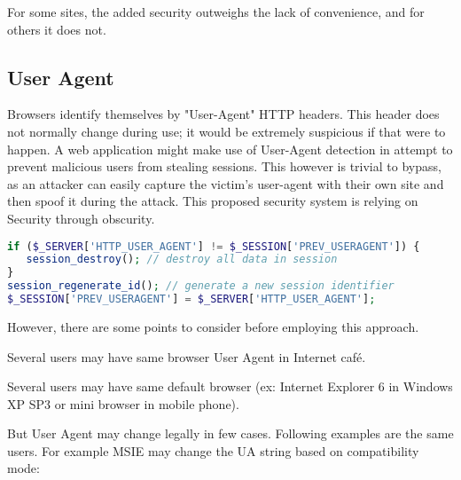 For some sites, the added security outweighs the lack of convenience, and for others it does not.




\subsection{User Agent}

Browsers identify themselves by "User-Agent" HTTP headers. This header does not normally change during use; it would be extremely suspicious if that were to happen. A web application might make use of User-Agent detection in attempt to prevent malicious users from stealing sessions. This however is trivial to bypass, as an attacker can easily capture the victim's user-agent with their own site and then spoof it during the attack. This proposed security system is relying on Security through obscurity.

\begin{lstlisting}[language=PHP]
if ($_SERVER['HTTP_USER_AGENT'] != $_SESSION['PREV_USERAGENT']) {
   session_destroy(); // destroy all data in session
}
session_regenerate_id(); // generate a new session identifier
$_SESSION['PREV_USERAGENT'] = $_SERVER['HTTP_USER_AGENT'];
\end{lstlisting}

However, there are some points to consider before employing this approach.

\begin{compactitem}
\item Several users may have same browser User Agent in Internet café.
\item Several users may have same default browser (ex: Internet Explorer 6 in Windows XP SP3 or mini browser in mobile phone).

\end{compactitem}

But User Agent may change legally in few cases. Following examples are the same users. For example MSIE may change the UA string based on compatibility mode:



